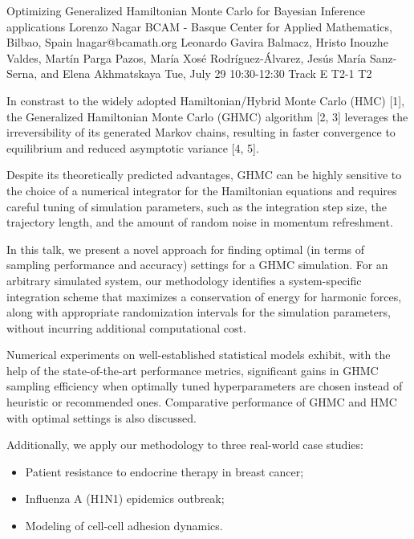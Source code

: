 \begin{talk}
  {Optimizing Generalized Hamiltonian Monte Carlo for Bayesian Inference applications}%
  {Lorenzo Nagar}%
  {BCAM - Basque Center for Applied Mathematics, Bilbao, Spain}%
  {lnagar@bcamath.org}%
  {Leonardo Gavira Balmacz, Hristo Inouzhe Valdes, Mart\'in Parga Pazos, Mar\'ia Xos\'e Rodr\'iguez-\'Alvarez, Jes\'us Mar\'ia Sanz-Serna, and Elena Akhmatskaya}%
  {}%
  {Tue, July 29 10:30-12:30 Track E}%
  {T2-1}%
  {T2}%
			
In constrast to the widely adopted Hamiltonian/Hybrid Monte Carlo (HMC) [1], the Generalized Hamiltonian Monte Carlo (GHMC) algorithm [2, 3] leverages the irreversibility of its generated Markov chains, resulting in faster convergence to equilibrium and reduced asymptotic variance [4, 5]. 

Despite its theoretically predicted advantages, GHMC can be highly sensitive to the choice of a numerical integrator for the Hamiltonian equations and requires careful tuning of simulation parameters, such as the integration step size, the trajectory length, and the amount of random noise in momentum refreshment.

In this talk, we present a novel approach for finding optimal (in terms of sampling performance and accuracy) settings for a GHMC simulation. For an arbitrary simulated system, our methodology identifies a system-specific integration scheme that maximizes a conservation of energy for harmonic forces, along with appropriate randomization intervals for the simulation parameters, without incurring additional computational cost.

Numerical experiments on well-established statistical models exhibit, with the help of the state-of-the-art performance metrics, significant gains in GHMC sampling efficiency when optimally tuned hyperparameters are chosen instead of heuristic or recommended ones. Comparative performance of GHMC and HMC with optimal settings is also discussed. 

Additionally, we apply our methodology to three real-world case studies:
\begin{itemize}
\item Patient resistance to endocrine therapy in breast cancer;
\item Influenza A (H1N1) epidemics outbreak;
\item Modeling of cell-cell adhesion dynamics.
\end{itemize}


\end{talk}
